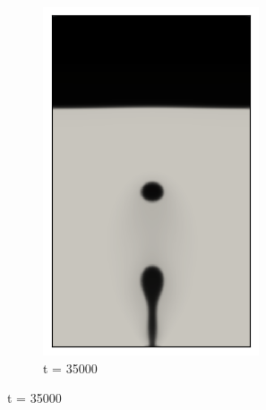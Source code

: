 \begin{figure}[H]
\begin{subfigure}{0.25\textwidth}
		\includegraphics[width=\linewidth]{figs/cap4/bb_760_s35}
		\caption{t = 35000}
		\label{fig:6}
	\end{subfigure}
	

\end{figure}

